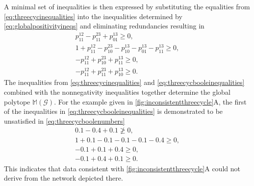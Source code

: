 A minimal set of inequalities is then expressed by substituting the equalities from \ref{eq:threecycinequalities} into the inequalities determined by \ref{eq:globalpositivityineqs} and eliminating redundancies resulting in
\begin{equation}
\begin{aligned}\label{eq:threecycbooleinequalities}
p^{12}_{11} - p^{23}_{11} + p^{13}_{01} \geq 0, \\
1 + p^{12}_{11} - p^{23}_{10} - p^{13}_{10} - p^{13}_{01} - p^{13}_{11} \geq 0, \\
-p^{12}_{11} + p^{23}_{10} + p^{13}_{11} \geq 0, \\
-p^{12}_{11} + p^{23}_{11} + p^{13}_{10} \geq 0.
\end{aligned}
\end{equation}
The inequalities from \ref{eq:threecycinequalities} and \ref{eq:threecycbooleinequalities} combined with the nonnegativity inequalities together determine the global polytope $\mathbb{M}(\mathcal{G})$. For the example given in \ref{fig:inconsistentthreecycle}A, the first of the inequalities in \ref{eq:threecycbooleinequalities} is demonstrated to be unsatisfied in \ref{eq:threecycboolenumbers}
\begin{equation}
\begin{aligned}\label{eq:threecycboolenumbers}
0.1 - 0.4 + 0.1 \not\geq 0, \\
1 + 0.1 - 0.1 - 0.1 - 0.1 - 0.4 \geq 0, \\
-0.1 + 0.1 + 0.4 \geq 0, \\
-0.1 + 0.4 + 0.1 \geq 0.
\end{aligned}
\end{equation}
This indicates that data consistent with \ref{fig:inconsistentthreecycle}A could not derive from the network depicted there.
